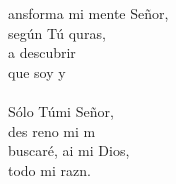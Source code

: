 \begin{cancion}%
	ansforma mi mente Señor,\\
	según Tú quras,\\
	a descubrir\\
	que soy y\\
	\jump\\
	Sólo Túmi Señor,\\
	des reno mi m\\
	 buscaré, ai mi Dios,\\
	 todo mi razn.\\
\end{cancion}%
